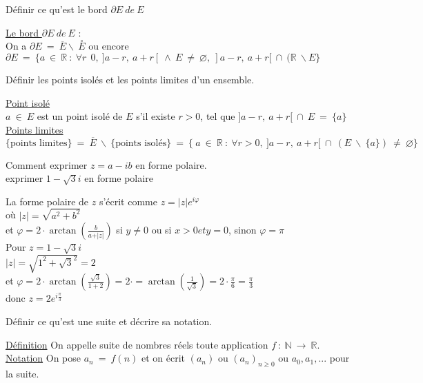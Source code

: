 \documentclass[12pt]{article}
\newcommand*{\xfield}[1]{\begin{mdframed}\centering #1\end{mdframed}\bigskip}
\newenvironment{note}{}{}
\begin{document}
\begin{note}
    \xfield{ Définir ce qu'est le bord $\partial E\ de\ E$}
    \xfield{
        \underline{Le bord $\partial E\ de\ E$} :\\
        On a $\partial E\ =\ \overline E \backslash\ \overset{\circ}{E}$ ou encore $\partial E\ =\ \{ a\ \in\ \mathbb{R}\ :\ \forall r\ \> 0,\ ] a-r,\ a+r[\ \wedge\ E\ \neq\ \varnothing ,\ ] a-r,\ a+r[\ \cap\ (\mathbb{R}\ \backslash E \}$
    }
\end{note}

\begin{note}
    \xfield{Définir les points isolés et les points limites d'un ensemble.}
    \xfield{
        \underline{Point isolé}\\ $a\ \in\ E$ est un point isolé de $E$ s'il existe $r > 0$, tel que $]a-r,\ a+r[\ \cap\ E\ =\ \{a\}$\\
        \underline{Points limites}\\
        $\text{\{points limites\}}\ =\ \overline{E}\ \backslash\ \text{\{points isolés\}}\ =\ \{\ a\ \in\ \mathbb{R}\ :\ \forall r >0,\ ]a-r,\ a+r[\ \cap\ (E\ \backslash\ \{a\})\ \neq\ \varnothing \}$
    }
\end{note}

\begin{note}
	\xfield{Comment exprimer $z=a-ib$ en forme polaire.
	\\exprimer $1-\sqrt{3}i$ en forme polaire}
	\xfield{La forme polaire de $z$ s'écrit comme $z= \vert z \vert e^{i \varphi}$ \\
	où $\vert z \vert = \sqrt{a^2+b^2}$\\
	et $\varphi = 2 \cdot \arctan(\frac{b}{a+\vert z \vert})$ si $y \neq 0$ ou si $x > 0 et y = 0$, sinon $\varphi = \pi$\\
	Pour $z = 1-\sqrt{3}i$\\
	$\vert z \vert = \sqrt{1^2+\sqrt{3}^2} = 2$\\
	et $\varphi =  2 \cdot \arctan(\frac{\sqrt{3}}{1+2}) = 2 \cdot = \arctan(\frac{1}{\sqrt{3}})=2 \cdot \frac{\pi}{6} = \frac{\pi}{3}$\\
	donc $z= 2 e^{i \frac{\pi}{3}}$}
\end{note}

\begin{note}
    \xfield{Définir ce qu'est une suite et décrire sa notation.}
    \xfield{
        \underline{Définition} On appelle suite de nombres réels toute application $f\ :\ \mathbb{N}\ \rightarrow\ \mathbb{R}$.\\
        \underline{Notation} On pose $a_n\ =\ f(n)$ et on écrit $(a_n)$ ou $(a_n)_{n \ge 0}$ ou $a_0,a_1,$... pour la suite.
    }
\end{note}
\end{document}

